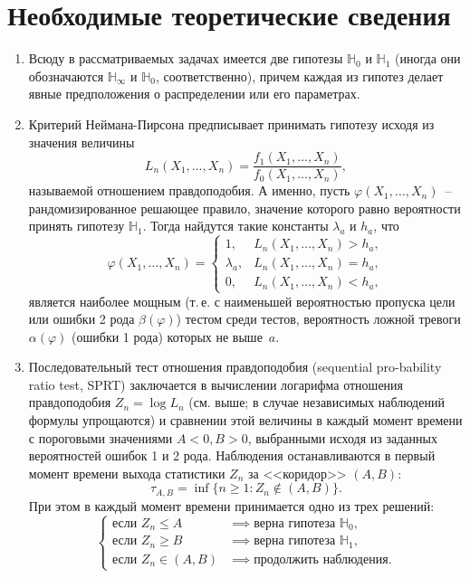 \documentclass[a4paper,14pt]{extreport}
\renewcommand{\=}[1]{\stackrel{#1}{=}} %
\newenvironment{boenumerate}
  {\begin{enumerate}\renewcommand\labelenumi{\textbf{\theenumi.}}}
  {\end{enumerate}}
\begin{document}
\newpage

\section*{Необходимые теоретические сведения}

\begin{boenumerate}
    \item Всюду в рассматриваемых задачах
    имеется две гипотезы $\mathbb{H}_0$ и $\mathbb{H}_1$ 
    (иногда они обозначаются $\mathbb{H}_{\infty}$ и
    $\mathbb{H}_0$, соответственно), причем каждая 
    из гипотез делает явные предположения о распределении
    или его параметрах.
    \item Критерий Неймана-Пирсона предписывает
    принимать гипотезу исходя из значения величины
    \[
    L_n(X_1, \ldots, X_n) = 
        \frac
        {f_1(X_1, \ldots, X_n)}
        {f_0(X_1, \ldots, X_n)},
    \]
    называемой отношением правдоподобия.
    А именно, пусть $\varphi(X_1, \ldots, X_n)$~-- 
    рандомизированное решающее правило, значение
    которого равно вероятности принять 
    гипотезу $\mathbb{H}_1$. Тогда найдутся такие
    константы $\lambda_a$ и $h_a$, что 
    \[
    \varphi(X_1, \ldots, X_n) = 
    \begin{cases}
        1, & L_n(X_1, \ldots, X_n) > h_a, \\
        \lambda_a, & L_n(X_1, \ldots, X_n) = h_a, \\
        0, & L_n(X_1, \ldots, X_n) < h_a,
    \end{cases}
    \]
    является наиболее мощным 
    (т.\,е. с наименьшей вероятностью пропуска цели 
    или ошибки 2 рода $\beta(\varphi)$) тестом 
    среди тестов, вероятность ложной
    тревоги $\alpha(\varphi)$
    (ошибки 1 рода) которых не выше~$a$.

    \item Последовательный тест отношения
    правдоподобия (sequential pro-bability 
    ratio test, SPRT) заключается в вычислении
    логарифма отношения правдоподобия $Z_n = \log L_n$
    (см. выше; в случае независимых наблюдений
    формулы упрощаются) и сравнении этой величины
    в каждый момент времени с пороговыми
    значениями $A < 0, B > 0$, выбранными исходя
    из заданных вероятностей ошибок 1 и 2 рода.
    Наблюдения останавливаются в первый
    момент времени выхода статистики 
    $Z_n$ за <<коридор>> $(A, B)$: 
    \[
    \tau_{A,B} = \inf \{n \geqslant 1: 
    Z_n \notin (A, B)\}. 
    \]
    При этом в каждый момент времени принимается
    одно из трех решений: 
    \[
    \begin{cases}
        \text{если } Z_n \leqslant A & \implies
            \text{верна гипотеза } \mathbb{H}_0, \\
        \text{если } Z_n \geqslant B & \implies
            \text{верна гипотеза } \mathbb{H}_1, \\
        \text{если } Z_n \in (A, B) & \implies
            \text{продолжить наблюдения}.
    \end{cases}
    \]


\end{boenumerate}
\end{document}
